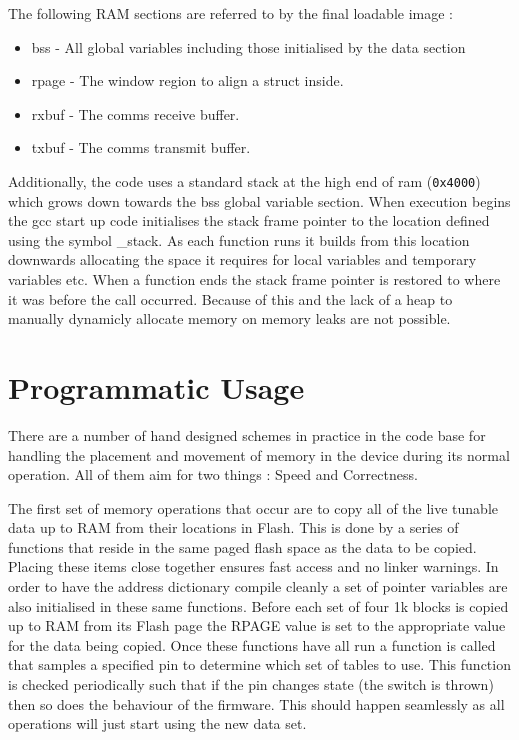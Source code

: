 \documentclass[12pt,a4wide,titlepage]{article}
\begin{document}
The following RAM sections are referred to by the final loadable image :

\begin{itemize}
\item bss - All global variables including those initialised by the data section
\item rpage - The window region to align a struct inside.
\item rxbuf - The comms receive buffer.
\item txbuf - The comms transmit buffer.
\end{itemize}


Additionally, the code uses a standard stack at the high end of ram (\texttt{0x4000}) which grows down towards the bss global variable section. When execution begins the gcc start up code initialises the stack frame pointer to the location defined using the symbol \_stack. As each function runs it builds from this location downwards allocating the space it requires for local variables and temporary variables etc. When a function ends the stack frame pointer is restored to where it was before the call occurred. Because of this and the lack of a heap to manually dynamicly allocate memory on memory leaks are not possible.




\section{Programmatic Usage}

There are a number of hand designed schemes in practice in the code base for handling the placement and movement of memory in the device during its normal operation. All of them aim for two things : Speed and Correctness.

The first set of memory operations that occur are to copy all of the live tunable data up to RAM from their locations in Flash. This is done by a series of functions that reside in the same paged flash space as the data to be copied. Placing these items close together ensures fast access and no linker warnings. In order to have the address dictionary compile cleanly a set of pointer variables are also initialised in these same functions. Before each set of four 1k blocks is copied up to RAM from its Flash page the RPAGE value is set to the appropriate value for the data being copied. Once these functions have all run a function is called that samples a specified pin to determine which set of tables to use. This function is checked periodically such that if the pin changes state (the switch is thrown) then so does the behaviour of the firmware. This should happen seamlessly as all operations will just start using the new data set.
\end{document}
